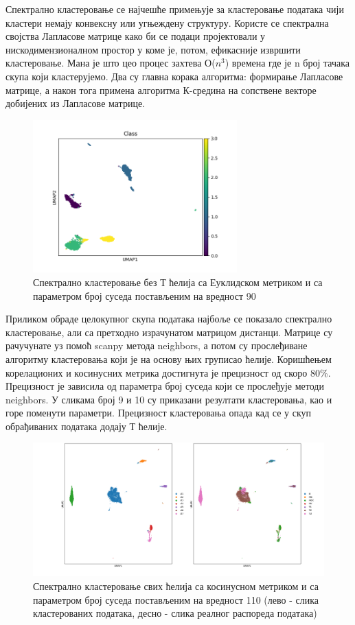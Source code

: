 \documentclass[10pt, a4paper]{article}
\begin{document}
Спектрално кластеровање се најчешће примењује за кластеровање података чији кластери немају конвексну или угњеждену структуру. Користе се спектрална својства Лапласове матрице како би се подаци пројектовали у нискодимензионалном простор у коме је, потом, ефикасније извршити кластеровање. Мана је што цео процес захтева О($n^3$) времена где је n број тачака скупа који кластерујемо. Два су главна корака алгоритма: формирање Лапласове матрице, а након тога примена алгоритма К-средина на сопствене векторе добијених из Лапласове матрице.
\begin{figure}[H]
    \centering
    \captionsetup{justification=centering}
    \includegraphics[width=0.7\textwidth]{spectral_cosine_90.png}
    \caption{Спектрално кластеровање без Т ћелија са Еуклидском метриком и са параметром број суседа постављеним на вредност 90}
    \label{fig:gustina2}
\end{figure}
\newpage
Приликом обраде целокупног скупа података најбоље се показало спектрално кластеровање, али са претходно израчунатом матрицом дистанци. Матрице су рачучунате уз помоћ scanpy метода neighbors, а потом су прослеђиване алгоритму кластеровања који је на основу њих груписао ћелије. Коришћењем корелационих и косинусних метрика достигнута је прецизност од скоро 80\%. Прецизност је зависила од параметра број суседа који се прослеђује методи neighbors. У сликама број 9 и 10 су приказани резултати кластеровања, као и горе поменути параметри. Прецизност кластеровања опада кад се у скуп обрађиваних података додају Т ћелије.

\begin{figure}[H]
    \centering
    \captionsetup{justification=centering}
    \includegraphics[width=1.1\textwidth]{all_cells_cosine_110.png}
    \caption{Спектрално кластеровање свих ћелија са косинусном метриком и са параметром број суседа постављеним на вредност 110 (лево - слика кластерованих података, десно - слика реалног распореда података)}
    \label{fig:gustina2}
\end{figure}
\end{document}
